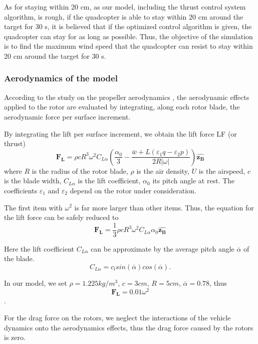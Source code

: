 As for staying within 20 cm, as our model, including the thrust control system algorithm, is rough, if the quadcopter is able to stay within 20 cm around the target for 30 s, it is believed that if the optimized control algorithm is given, the quadcopter can stay for as long as possible. Thus, the objective of the simulation is to find the maximum wind speed that the quadcopter can resist to stay within 20 cm around the target for 30 s.

\subsubsection{Aerodynamics of the model}
According to the study on the propeller aerodynamics \cite{bib1}, the aerodynamic effects applied to the rotor are evaluated by integrating, along each rotor blade, the aerodynamic force per surface increment.

By integrating the lift per surface increment, we obtain the lift force LF (or thrust)
\begin{equation}
 \mathbf{F_{L}}=\rho c R^{3} \omega^{2} C_{L \alpha}\left(\frac{\alpha_{0}}{3}-\frac{\bar{w}+L\left(\varepsilon_{1} q-\varepsilon_{2} p\right)}{2 R|\omega|}\right) \hat{\mathbf{z}_{\mathbf{B}}}
\end{equation}
where $R$ is the radius of the rotor blade, $\rho$ is the air density, $U$ is the airspeed, $c$ is the blade width, $C_{L \alpha}$ is the lift coefficient, $\alpha_{0}$ its pitch angle at rest. The coefficients $\varepsilon_{1}$ and $\varepsilon_{2}$ depend on the rotor under consideration.

The first item with $\omega^{2}$ is far more larger than other items. Thus, the equation for the lift force can be safely reduced to \begin{equation}
\mathbf{F_{L}}=\frac{1}{3}\rho c R^{3} \omega^{2} C_{L \alpha}\alpha_{0} \hat{\mathbf{z}_{\mathbf{B}}}
\end{equation}

Here the lift coefficient $C_{L\alpha}$ can be approximate by the average pitch angle $\overline{\alpha}$ \cite{bib3} of the blade. \begin{equation}
    C_{L\alpha}=c_{l}sin(\overline{\alpha})cos(\overline{\alpha}).
\end{equation}

In our model, we set $\rho=1.225kg/m^{3}$, $c=3cm$, $R=5cm$, $\overline{\alpha}=0.78$, thus $$\mathbf{F_{L}}=0.01\omega^{2}$$.

For the drag force on the rotors, we neglect the interactions of the vehicle dynamics onto the aerodynamics effects, thus the drag force caused by the rotors is zero.

